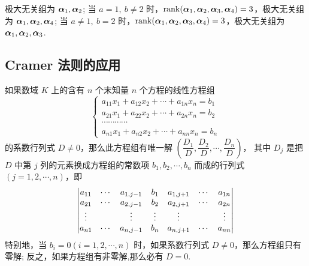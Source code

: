 \begin{solution}
\begin{enumerate}[label=(\arabic{*})]
              极大无关组为 $\vb*{\alpha}_1,\vb*{\alpha}_2$;
              当 $a=1,~b\neq 2$ 时，$\rank(\vb*{\alpha}_1,\vb*{\alpha}_2,\vb*{\alpha}_3,\vb*{\alpha}_4)=3$，极大无关组为 $\vb*{\alpha}_1,\vb*{\alpha}_2,\vb*{\alpha}_4$;
              当 $a\neq 1,~b=2$ 时，$\rank(\vb*{\alpha}_1,\vb*{\alpha}_2,\vb*{\alpha}_3,\vb*{\alpha}_4)=3$，极大无关组为 $\vb*{\alpha}_1,\vb*{\alpha}_2,\vb*{\alpha}_3$.
    \end{enumerate}
\end{solution}

\subsection{Cramer 法则的应用}

\begin{theorem}[Cramer 法则]
    如果数域 $ K $ 上的含有 $ n $ 个末知量 $ n $ 个方程的线性方程组
    $$\begin{cases}
            a_{11} x_{1}+a_{12} x_{2}+\cdots+a_{1 n} x_{n}=b_{1} \\
            a_{21} x_{1}+a_{22} x_{2}+\cdots+a_{2 n} x_{n}=b_{2} \\
            \cdots \cdots \cdots \cdots                          \\
            a_{n 1} x_{1}+a_{n 2} x_{2}+\cdots+a_{n n} x_{n}=b_{n}
        \end{cases}$$
    的系数行列式 $ D \neq 0$，那么此方程组有唯一解 $ \left(\dfrac{D_{1}}{D}, \dfrac{D_{2}}{D}, \cdots, \dfrac{D_{n}}{D}\right)$，
    其中 $ D_{j} $ 是把 $ D $ 中第 $ j $ 列的元素换成方程组的常数项 $ b_{1}, b_{2}, \cdots, b_{n} $ 而成的行列式 $ (j=1,2, \cdots, n)$，即
    $$\mqty|a_{11}  & \cdots & a_{1, j-1} & b_{1}  & a_{1, j+1} & \cdots & a_{1 n} \\
        a_{21}  & \cdots & a_{2, j-1} & b_{2}  & a_{2, j+1} & \cdots & a_{2 n} \\
        \vdots  &        & \vdots     & \vdots & \vdots     &        & \vdots  \\
        a_{n 1} & \cdots & a_{n, j-1} & b_{n}  & a_{n, j+1} & \cdots & a_{n n}|$$
    特别地，当 $ b_{i}=0(i=1,2, \cdots, n) $ 时，如果系数行列式 $ D \neq 0 $，那么方程组只有零解;
    反之，如果方程组有非零解,那么必有 $ D=0 .$
\end{theorem}

